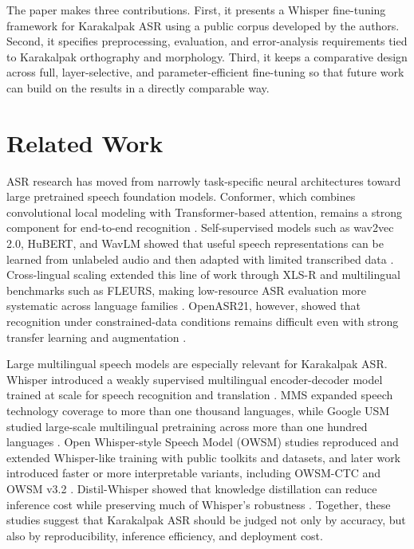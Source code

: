 \documentclass[11pt]{article}
\begin{document}
The paper makes three contributions. First, it presents a Whisper fine-tuning framework for Karakalpak ASR using a public corpus developed by the authors. Second, it specifies preprocessing, evaluation, and error-analysis requirements tied to Karakalpak orthography and morphology. Third, it keeps a comparative design across full, layer-selective, and parameter-efficient fine-tuning so that future work can build on the results in a directly comparable way.

\section{Related Work}

ASR research has moved from narrowly task-specific neural architectures toward large pretrained speech foundation models. Conformer, which combines convolutional local modeling with Transformer-based attention, remains a strong component for end-to-end recognition \cite{gulati2020conformer}. Self-supervised models such as wav2vec 2.0, HuBERT, and WavLM showed that useful speech representations can be learned from unlabeled audio and then adapted with limited transcribed data \cite{baevski2020wav2vec2,hsu2021hubert,chen2022wavlm}. Cross-lingual scaling extended this line of work through XLS-R and multilingual benchmarks such as FLEURS, making low-resource ASR evaluation more systematic across language families \cite{babu2022xlsr,conneau2022fleurs}. OpenASR21, however, showed that recognition under constrained-data conditions remains difficult even with strong transfer learning and augmentation \cite{peterson2022openasr21}.

Large multilingual speech models are especially relevant for Karakalpak ASR. Whisper introduced a weakly supervised multilingual encoder-decoder model trained at scale for speech recognition and translation \cite{radford2023robust}. MMS expanded speech technology coverage to more than one thousand languages, while Google USM studied large-scale multilingual pretraining across more than one hundred languages \cite{pratap2023mms,zhang2023usm}. Open Whisper-style Speech Model (OWSM) studies reproduced and extended Whisper-like training with public toolkits and datasets, and later work introduced faster or more interpretable variants, including OWSM-CTC and OWSM v3.2 \cite{peng2023owsm,peng2024owsmctc,tian2024heterogeneous}. Distil-Whisper showed that knowledge distillation can reduce inference cost while preserving much of Whisper's robustness \cite{gandhi2023distilwhisper}. Together, these studies suggest that Karakalpak ASR should be judged not only by accuracy, but also by reproducibility, inference efficiency, and deployment cost.
\end{document}
